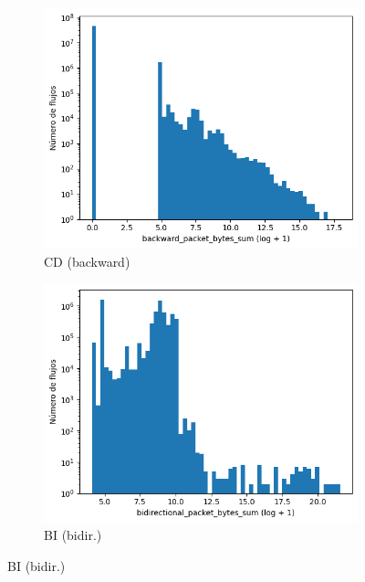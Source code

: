 \begin{figure}[H]
\begin{subfigure}[b]{0.26\textwidth}
        \includegraphics[width=\textwidth]{media/packet_pincer_cicddos/backward_packet_bytes_sum_log_x_log_y.png}
        \caption{CD (backward)}
    \end{subfigure}
    \hfill
    \begin{subfigure}[b]{0.26\textwidth}
        \centering
        \includegraphics[width=\linewidth]{media/packet_pincer_botiot/bidirectional_packet_bytes_sum_log_x_log_y.png}
        \caption{BI (bidir.)}

\end{subfigure}
\end{figure}
